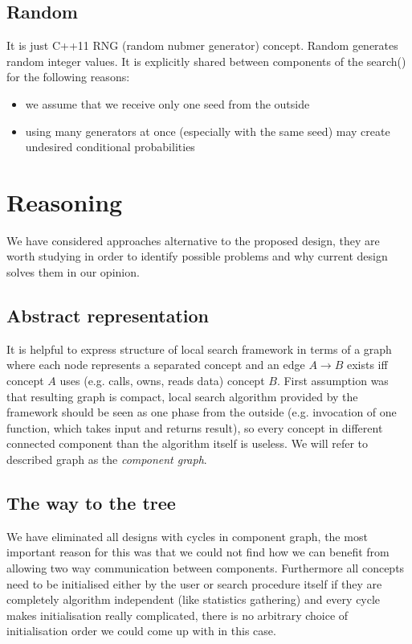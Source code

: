 \subsection{Random}

It is just C++11 RNG (random nubmer generator) concept.
Random generates random integer values.
It is explicitly shared between components of the search() for the following reasons:
\begin{itemize}
\item we assume that we receive only one seed from the outside
\item using many generators at once (especially with the same seed) may create undesired conditional probabilities
\end{itemize}

\section{Reasoning}

We have considered approaches alternative to the proposed design, they are
worth studying in order to identify possible problems and why current design
solves them in our opinion.

\subsection{Abstract representation}
It is helpful to express structure of local search framework in terms of a
graph where each node represents a separated concept and an edge $A \to B$
exists iff concept $A$ uses (e.g. calls, owns, reads data) concept $B$. First
assumption was that resulting graph is compact, local search algorithm provided
by the framework should be seen as one phase from the outside (e.g. invocation
of one function, which takes input and returns result), so every concept in
different connected component than the algorithm itself is useless. We will
refer to described graph as the \emph{component graph}.

\subsection{The way to the tree}
We have eliminated all designs with cycles in component graph, the most
important reason for this was that we could not find how we can benefit from
allowing two way communication between components. Furthermore all concepts
need to be initialised either by the user or search procedure itself if they are
completely algorithm independent (like statistics gathering) and every cycle
makes initialisation really complicated, there is no arbitrary choice of
initialisation order we could come up with in this case.

